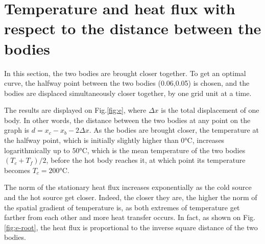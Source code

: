 \documentclass[a4paper,12pt,twoside]{article}
\begin{document}
\section{Temperature and heat flux with respect to the distance between the bodies}

In this section, the two bodies are brought closer together. To get an optimal curve, the halfway point between the two bodies (0.06,0.05) is chosen, and the bodies are displaced simultaneously closer together, by one grid unit at a time.

The results are displayed on Fig.\ref{fig:e}, where $\Delta x$ is the total displacement of one body. In other words, the distance between the two bodies at any point on the graph is $d = x_c-x_b-2\Delta x$. As the bodies are brought closer, the temperature at the halfway point, which is initially slightly higher than $0$°C, increases logarithmically up to $50$°C, which is the mean temperature of the two bodies $(T_c+T_f)/2$, before the hot body reaches it, at which point its temperature becomes $T_c=200$°C.

The norm of the stationary heat flux increases exponentially as the cold source and the hot source get closer. Indeed, the closer they are, the higher the norm of the spatial gradient of temperature is, as both extremes of temperature get farther from each other and more heat transfer occurs. In fact, as shown on Fig.\ref{fig:e-root}, the heat flux is proportional to the inverse square distance of the two bodies.
\end{document}
